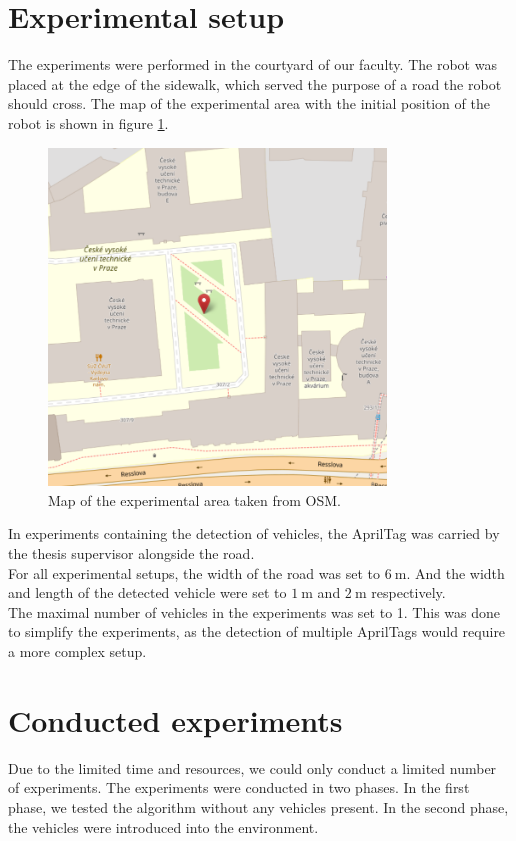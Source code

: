 \section{Experimental setup}
    The experiments were performed in the courtyard of our faculty. The robot was placed at the edge of the sidewalk, which served the purpose of a road the robot should cross. The map of the experimental area with the initial position of the robot is shown in figure \ref{fig:map}.\\
    \begin{figure}[ht]
        \centering
        \includegraphics[width=0.8\textwidth]{images/map.png}
        \caption{Map of the experimental area taken from OSM.}
        \label{fig:map}
    \end{figure}
    In experiments containing the detection of vehicles, the AprilTag was carried by the thesis supervisor alongside the road.\\
    For all experimental setups, the width of the road was set to $6\:\si{\m}$. And the width and length of the detected vehicle were set to $1\:\si{\m}$ and $2\:\si{\m}$ respectively.\\
    The maximal number of vehicles in the experiments was set to 1. This was done to simplify the experiments, as the detection of multiple AprilTags would require a more complex setup.

\section{Conducted experiments}
    Due to the limited time and resources, we could only conduct a limited number of experiments. The experiments were conducted in two phases. In the first phase, we tested the algorithm without any vehicles present. In the second phase, the vehicles were introduced into the environment.

